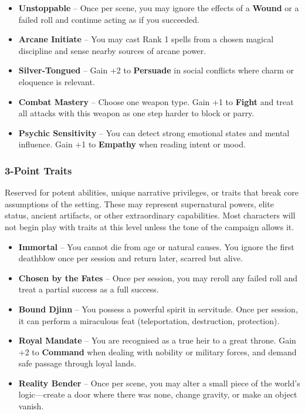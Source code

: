     \begin{itemize}
        \item \textbf{Unstoppable} – Once per scene, you may ignore the effects of a \textbf{Wound} or a failed roll and continue acting as if you succeeded.
        \item \textbf{Arcane Initiate} – You may cast Rank 1 spells from a chosen magical discipline and sense nearby sources of arcane power.
        \item \textbf{Silver-Tongued} – Gain +2 to \textbf{Persuade} in social conflicts where charm or eloquence is relevant.
        \item \textbf{Combat Mastery} – Choose one weapon type. Gain +1 to \textbf{Fight} and treat all attacks with this weapon as one step harder to block or parry.
        \item \textbf{Psychic Sensitivity} – You can detect strong emotional states and mental influence. Gain +1 to \textbf{Empathy} when reading intent or mood.
    \end{itemize}

\subsubsection{3-Point Traits}
Reserved for potent abilities, unique narrative privileges, or traits that break core assumptions of the setting. These may represent supernatural powers, elite status, ancient artifacts, or other extraordinary capabilities. Most characters will not begin play with traits at this level unless the tone of the campaign allows it.

    \begin{itemize}
        \item \textbf{Immortal} – You cannot die from age or natural causes. You ignore the first deathblow once per session and return later, scarred but alive.
        \item \textbf{Chosen by the Fates} – Once per session, you may reroll any failed roll and treat a partial success as a full success.
        \item \textbf{Bound Djinn} – You possess a powerful spirit in servitude. Once per session, it can perform a miraculous feat (teleportation, destruction, protection).
        \item \textbf{Royal Mandate} – You are recognised as a true heir to a great throne. Gain +2 to \textbf{Command} when dealing with nobility or military forces, and demand safe passage through loyal lands.
        \item \textbf{Reality Bender} – Once per scene, you may alter a small piece of the world’s logic—create a door where there was none, change gravity, or make an object vanish.
    \end{itemize}

